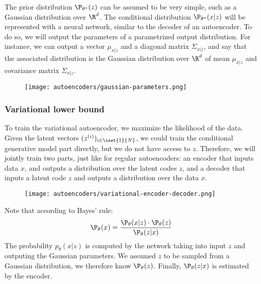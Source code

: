 The prior distribution $\P_{\theta^*}(z)$ can be assumed to be very simple, such as a Gaussian distribution over $\R^d$. The conditional distribution $\P_{\theta^*}(x|z)$ will be represented with a neural network, similar to the decoder of an autoencoder. To do so, we will output the parameters of a parametrized output distribution. For instance, we can output a vector $\mu_{x|z}$ and a diagonal matrix $\Sigma_{x|z}$, and say that the associated distribution is the Gaussian distribution over $\R^d$ of mean $\mu_{x|z}$ and covariance matrix $\Sigma_{x|z}$.
\begin{figure}[H]
    \centering
    \texttt{[image: autoencoders/gaussian-parameters.png]}
\end{figure}

\subsubsection{Variational lower bound}
To train the variational autoencoder, we maximize the likelihood of the data. Given the latent vectors $(z^{(i)})_{i\in\iset{1}{N}}$, we could train the conditional generative model part directly, but we do not have access to $z$. Therefore, we will jointly train two parts, just like for regular autoencoders: an encoder that inputs data $x$, and outputs a distribution over the latent codes $z$, and a decoder that inputs a latent code $z$ and outputs a distribution over the data $x$.

\begin{figure}[H]
    \centering
    \texttt{[image: autoencoders/variational-encoder-decoder.png]}
\end{figure}

Note that according to Bayes' rule:
\begin{equation*}
    \P_\theta(x) = \frac{\P_\theta(x|z)\cdot \P_\theta(z)}{\P_\theta(z|x)}
\end{equation*}
The probability $p_\theta(x|z)$ is computed by the network taking into input $z$ and outputing the Gaussian parameters. We assumed $z$ to be sampled from a Gaussian distribution, we therefore know $\P_\theta(z)$. Finally, $\P_\theta(z|x)$ is estimated by the encoder.

